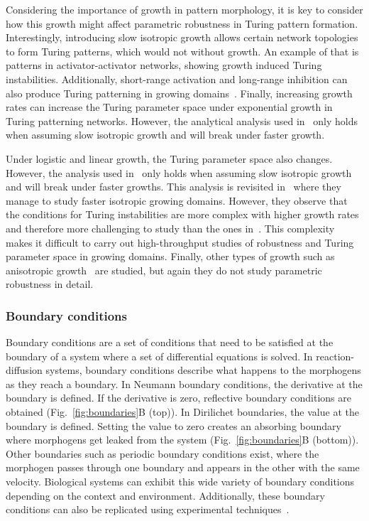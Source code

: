Considering the importance of growth in pattern morphology, it is key to consider how this growth might affect parametric robustness in Turing pattern formation.
Interestingly, introducing slow isotropic growth allows certain network topologies to form Turing patterns, which would not without growth.
An example of that is patterns in activator-activator networks, showing growth induced Turing instabilities.
Additionally, short-range activation and long-range inhibition can also produce Turing patterning in growing domains~\parencite{gaffney2010}.
Finally, increasing growth rates can increase the Turing parameter space under exponential growth in Turing patterning networks.
However, the analytical analysis used in~\cite{gaffney2010} only holds when assuming slow isotropic growth and will break under faster growth.

Under logistic and linear growth, the Turing parameter space also changes.
However, the analysis used in~\cite{gaffney2010} only holds when assuming slow isotropic growth and will break under faster growths.
This analysis is revisited in~\cite{Klika2017} where they manage to study faster isotropic growing domains.
However, they observe that the conditions for Turing instabilities are more complex with higher growth rates and therefore more challenging to study than the ones in~\cite{gaffney2010}.
This complexity makes it difficult to carry out high-throughput studies of robustness and Turing parameter space in growing domains.
Finally, other types of growth such as anisotropic growth~\parencite{Krause2019} are studied, but again they do not study parametric robustness in detail.

\subsubsection{Boundary conditions}\label{boundary_conditions_intro}
Boundary conditions are a set of conditions that need to be satisfied at the boundary of a system where a set of differential equations is solved.
In reaction-diffusion systems, boundary conditions describe what happens to the morphogens as they reach a boundary.
In Neumann boundary conditions, the derivative at the boundary is defined.
If the derivative is zero, reflective boundary conditions are obtained (Fig.~\ref{fig:boundaries}B (top)).
In Dirilichet boundaries, the value at the boundary is defined.
Setting the value to zero creates an absorbing boundary where morphogens get leaked from the system (Fig.~\ref{fig:boundaries}B (bottom)).
Other boundaries such as periodic boundary conditions exist, where the morphogen passes through one boundary and appears in the other with the same velocity.
Biological systems can exhibit this wide variety of boundary conditions depending on the context and environment.
Additionally, these boundary conditions can also be replicated using experimental techniques~\parencite{Krause2020, Sheth2012, Vahey2014}.

